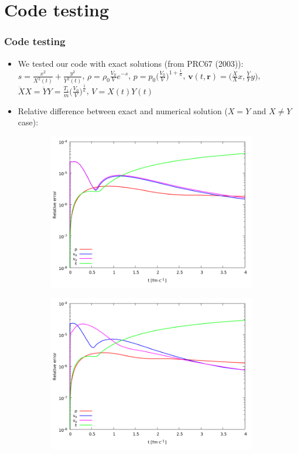 \documentclass{beamer}
\begin{document}
\section{Code testing}
\begin{frame}
\frametitle{Code testing}
\begin{itemize}
\item We tested our code with exact solutions (from PRC67 (2003)):
$s=\frac{x^2}{X^2(t)}+\frac{y^2}{Y^2(t)}$, $\rho = \rho_0\frac{V_0}{V}e^{-s}$,  $p=p_0\big(\frac{V_0}{V}\big)^{1+\frac{1}{\kappa}}$, $\bm{v}(t, \bm{r})=\big(\frac{\dot{X}}{X}x, \frac{\dot{Y}}{Y}y\big)$, $\ddot{X}X=\ddot{Y}Y=\frac{T_i}{m}\big(\frac{V_0}{V}\big)^{\frac{1}{\kappa}}$, $V=X(t)Y(t)$
\item Relative difference between exact and numerical solution ($X=Y$ and $X\neq Y$ case):
\end{itemize}
\begin{center}
\begin{figure}[H]
	\centering
    \begin{subfigure}[b]{0.49\textwidth}
    		\includegraphics[width=\textwidth]{pic/sym}
	\end{subfigure}
	\begin{subfigure}[b]{0.49\textwidth}
        	\includegraphics[width=\textwidth]{pic/asym}

\end{subfigure}
\end{figure}
\end{center}
\end{frame}
\end{document}
